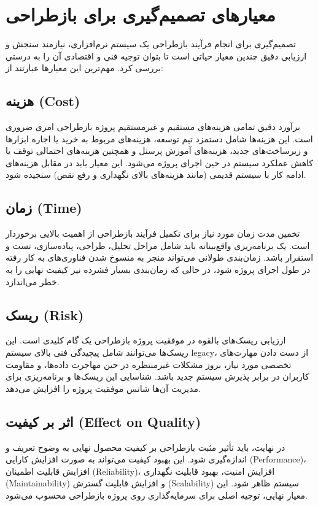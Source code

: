 \section{معیارهای تصمیم‌گیری برای بازطراحی}
\label{section:6}

تصمیم‌گیری برای انجام فرآیند بازطراحی یک سیستم نرم‌افزاری، نیازمند سنجش و ارزیابی دقیق چندین معیار حیاتی است تا بتوان توجیه فنی و اقتصادی آن را به درستی بررسی کرد. مهم‌ترین این معیارها عبارتند از:

\subsection{هزینه (Cost)}
برآورد دقیق تمامی هزینه‌های مستقیم و غیرمستقیم پروژه بازطراحی امری ضروری است. این هزینه‌ها شامل دستمزد تیم توسعه، هزینه‌های مربوط به خرید یا اجاره ابزارها و زیرساخت‌های جدید، هزینه‌های آموزش پرسنل و همچنین هزینه‌های احتمالی توقف یا کاهش عملکرد سیستم در حین اجرای پروژه می‌شود. این معیار باید در مقابل هزینه‌های ادامه کار با سیستم قدیمی (مانند هزینه‌های بالای نگهداری و رفع نقص) سنجیده شود.

\subsection{زمان (Time)}
تخمین مدت زمان مورد نیاز برای تکمیل فرآیند بازطراحی از اهمیت بالایی برخوردار است. یک برنامه‌ریزی واقع‌بینانه باید شامل مراحل تحلیل، طراحی، پیاده‌سازی، تست و استقرار باشد. زمان‌بندی طولانی می‌تواند منجر به منسوخ شدن فناوری‌های به کار رفته در طول اجرای پروژه شود، در حالی که زمان‌بندی بسیار فشرده نیز کیفیت نهایی را به خطر می‌اندازد.

\subsection{ریسک (Risk)}
ارزیابی ریسک‌های بالقوه در موفقیت پروژه بازطراحی یک گام کلیدی است. این ریسک‌ها می‌توانند شامل پیچیدگی فنی بالای سیستم legacy، از دست دادن مهارت‌های تخصصی مورد نیاز، بروز مشکلات غیرمنتظره در حین مهاجرت داده‌ها، و مقاومت کاربران در برابر پذیرش سیستم جدید باشد. شناسایی این ریسک‌ها و برنامه‌ریزی برای مدیریت آن‌ها شانس موفقیت پروژه را افزایش می‌دهد.

\subsection{اثر بر کیفیت (Effect on Quality)}
در نهایت، باید تأثیر مثبت بازطراحی بر کیفیت محصول نهایی به وضوح تعریف و اندازه‌گیری شود. این بهبود کیفیت می‌تواند به صورت افزایش کارایی (Performance)، افزایش قابلیت اطمینان (Reliability)، افزایش امنیت، بهبود قابلیت نگهداری (Maintainability) و افزایش قابلیت گسترش (Scalability) سیستم ظاهر شود. این معیار نهایی، توجیه اصلی برای سرمایه‌گذاری روی پروژه بازطراحی محسوب می‌شود.

